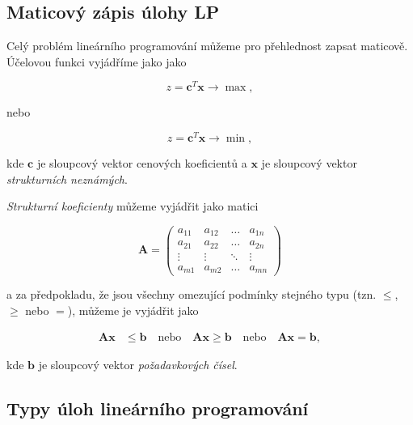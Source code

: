 \subsection{Maticový zápis úlohy LP}

Celý problém lineárního programování můžeme pro přehlednost zapsat maticově.
Účelovou funkci vyjádříme jako
jako

\begin{equation}
    z = \bm{c}^T\bm{x} \rightarrow \max,
\end{equation}

nebo

\begin{equation}
    z = \bm{c}^T\bm{x} \rightarrow \min,
\end{equation}

kde $\bm{c}$ je sloupcový vektor cenových koeficientů a $\bm{x}$ je sloupcový vektor \textit{strukturních neznámých}.

\textit{Strukturní koeficienty} můžeme vyjádřit jako matici

\begin{equation}
    \bm{A} = 
    \begin{pmatrix}
        a_{11} & a_{12} & \ldots & a_{1n} \\
        a_{21} & a_{22} & \ldots & a_{2n} \\
        \vdots & \vdots & \ddots & \vdots \\
        a_{m1} & a_{m2} & \ldots & a_{mn}
    \end{pmatrix}
\end{equation}

a za předpokladu, že jsou všechny omezující podmínky stejného typu (tzn. $\leq$, $\geq$ nebo $=$), můžeme je vyjádřit jako 

\begin{equation}
    \begin{split}
        \bm{A}\bm{x} &\leq \bm{b} \quad \text{nebo} \quad 
        \bm{A}\bm{x} \geq \bm{b} \quad \text{nebo} \quad 
        \bm{A}\bm{x} = \bm{b},
    \end{split}
    \end{equation}

kde $\bm{b}$ je sloupcový vektor \textit{požadavkových čísel}.

\subsection{Typy úloh lineárního programování}

